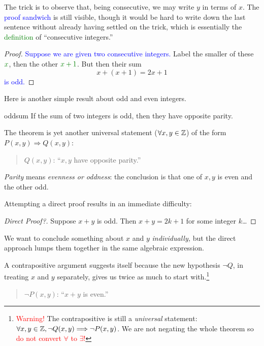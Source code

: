 	The trick is to observe that, being consecutive, we may write $y$ in terms of $x$. The \textcolor{blue}{proof sandwich} is still visible, though it would be hard to write down the last sentence without already having settled on the trick, which is essentially the \textcolor{Green}{definition} of ``consecutive integers.''
	
\begin{proof}
	\textcolor{blue}{Suppose we are given two consecutive integers.} Label the smaller of these $\textcolor{Green}{x}$, then the other $\textcolor{Green}{x+1}$. But then their sum
	\[x+(x+1)=2x+1\]
	\textcolor{blue}{is odd.}
\end{proof}



\goodbreak



Here is another simple result about odd and even integers.

\begin{thm}{}{oddsum}
	If the sum of two integers is odd, then they have opposite parity.
\end{thm}

The theorem is yet another universal statement ($\forall x,y\in\mathbb{Z}$) of the form $P(x,y)\Longrightarrow Q(x,y)$:
\begin{quote}
	$Q(x,y)$: ``$x,y$ have opposite parity.''
\end{quote}
\emph{Parity} means \emph{evenness or oddness}: the conclusion is that one of $x,y$ is even and the other odd.\smallbreak

Attempting a direct proof results in an immediate difficulty:

\begin{proof}[Direct Proof?]
	Suppose $x+y$ is odd. Then $x+y=2k+1$ for some integer $k$\ldots\phantom{\qedhere}
\end{proof}

We want to conclude something about $x$ and $y$ \emph{individually,} but the direct approach lumps them together in the same algebraic expression.\smallbreak

A contrapositive argument suggests itself because the new hypothesis $\neg Q$, in treating $x$ and $y$ separately, gives us twice as much to start with.\footnote{\textcolor{red}{Warning!} The contrapositive is still a \emph{universal} statement:  $\forall x,y\in\mathbb{Z}, \neg Q(x,y)\Longrightarrow \neg P(x,y)$. We are not negating the whole theorem so \textcolor{red}{do not convert $\forall$ to $\exists$!}}
\begin{quote}
	$\neg P(x,y)$: ``$x+y$ is even.''
\end{quote}

